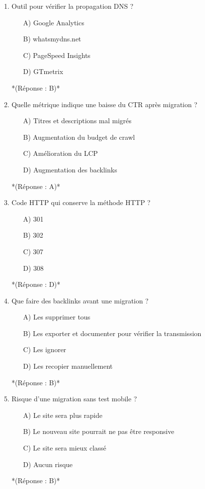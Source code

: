\documentclass[12pt,a4paper,twoside]{report}
\begin{document}
\begin{enumerate}
\item Outil pour vérifier la propagation DNS ?
\begin{itemize}
\item[A)] Google Analytics
\item[B)] whatsmydns.net
\item[C)] PageSpeed Insights
\item[D)] GTmetrix
\end{itemize}
*(Réponse : B)*

\item Quelle métrique indique une baisse du CTR après migration ?
\begin{itemize}
\item[A)] Titres et descriptions mal migrés
\item[B)] Augmentation du budget de crawl
\item[C)] Amélioration du LCP
\item[D)] Augmentation des backlinks
\end{itemize}
*(Réponse : A)*

\item Code HTTP qui conserve la méthode HTTP ?
\begin{itemize}
\item[A)] 301
\item[B)] 302
\item[C)] 307
\item[D)] 308
\end{itemize}
*(Réponse : D)*

\item Que faire des backlinks avant une migration ?
\begin{itemize}
\item[A)] Les supprimer tous
\item[B)] Les exporter et documenter pour vérifier la transmission
\item[C)] Les ignorer
\item[D)] Les recopier manuellement
\end{itemize}
*(Réponse : B)*

\item Risque d'une migration sans test mobile ?
\begin{itemize}
\item[A)] Le site sera plus rapide
\item[B)] Le nouveau site pourrait ne pas être responsive
\item[C)] Le site sera mieux classé
\item[D)] Aucun risque
\end{itemize}
*(Réponse : B)*


\end{enumerate}
\end{document}

